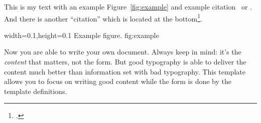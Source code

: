 This is my text with an example Figure~\ref{fig:example} and example
citation~\cite{StrunkWhite} or \textcite{Bringhurst1993}. And there is another
\enquote{citation} which is located at the bottom\footcite{tagstore}.

  {width=0.1\textwidth,height=0.1\textheight}%
  {Example figure.}%
  {}%
  {fig:example}%

Now you are able to write your own document. Always keep in mind: it's
the \emph{content} that matters, not the form. But good typography is
able to deliver the content much better than information set with bad
typography. This template allows you to focus on writing good content
while the form is done by the template definitions.


